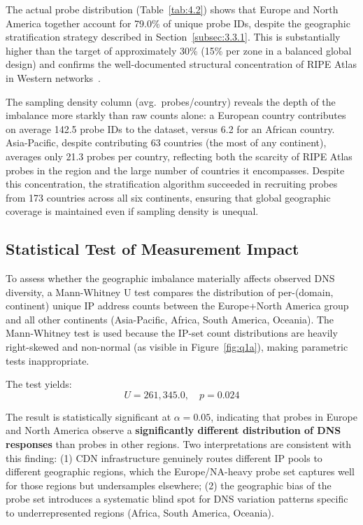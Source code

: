 The actual probe distribution (Table~\ref{tab:4.2}) shows that Europe and North America together account for 79.0\% of unique probe IDs, despite the geographic stratification strategy described in Section~\ref{subsec:3.3.1}. This is substantially higher than the target of approximately 30\% (15\% per zone in a balanced global design) and confirms the well-documented structural concentration of RIPE Atlas in Western networks~\cite{Bajpai2017}.

The sampling density column (avg.\ probes/country) reveals the depth of the imbalance more starkly than raw counts alone: a European country contributes on average 142.5 probe IDs to the dataset, versus 6.2 for an African country. Asia-Pacific, despite contributing 63 countries (the most of any continent), averages only 21.3 probes per country, reflecting both the scarcity of RIPE Atlas probes in the region and the large number of countries it encompasses. Despite this concentration, the stratification algorithm succeeded in recruiting probes from 173 countries across all six continents, ensuring that global geographic coverage is maintained even if sampling density is unequal.

\subsection{Statistical Test of Measurement Impact}
\label{subsec:4.4.2}

To assess whether the geographic imbalance materially affects observed DNS diversity, a Mann-Whitney U test compares the distribution of per-(domain, continent) unique IP address counts between the Europe+North America group and all other continents (Asia-Pacific, Africa, South America, Oceania). The Mann-Whitney test is used because the IP-set count distributions are heavily right-skewed and non-normal (as visible in Figure~\ref{fig:q1a}), making parametric tests inappropriate.

The test yields:
\[
U = 261{,}345.0, \quad p = 0.024
\]

The result is statistically significant at $\alpha = 0.05$, indicating that probes in Europe and North America observe a \textbf{significantly different distribution of DNS responses} than probes in other regions. Two interpretations are consistent with this finding: (1) CDN infrastructure genuinely routes different IP pools to different geographic regions, which the Europe/NA-heavy probe set captures well for those regions but undersamples elsewhere; (2) the geographic bias of the probe set introduces a systematic blind spot for DNS variation patterns specific to underrepresented regions (Africa, South America, Oceania).

